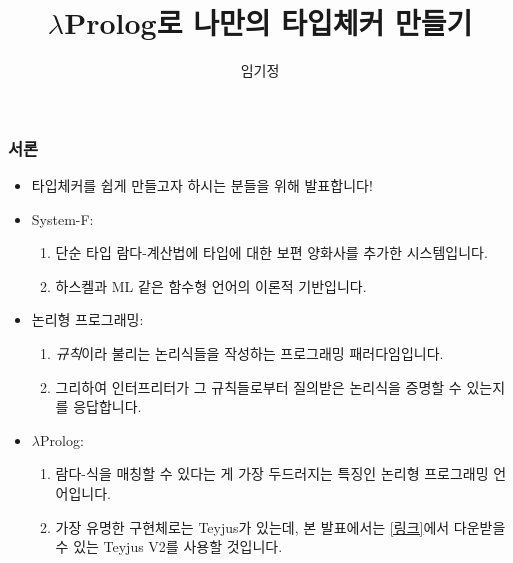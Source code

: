 \documentclass[slidestop,compress,mathserif]{beamer}
\author{ 임기정 }
\title{$\lambda$Prolog로 나만의 타입체커 만들기}
\begin{document}
    \begin{frame}
        \titlepage
    \end{frame}

    \begin{frame}
        \frametitle{서론}
        \begin{itemize}
            \item 타입체커를 쉽게 만들고자 하시는 분들을 위해 발표합니다!
            \pause
            \item System-F:
            \begin{enumerate}
                \item 단순 타입 람다-계산법에 타입에 대한 보편 양화사를 추가한 시스템입니다.
                \item 하스켈과 ML 같은 함수형 언어의 이론적 기반입니다.
            \end{enumerate}
            \pause
            \item 논리형 프로그래밍:
            \begin{enumerate}
                \item \textit{규칙}이라 불리는 논리식들을 작성하는 프로그래밍 패러다임입니다.
                \item 그리하여 인터프리터가 그 규칙들로부터 질의받은 논리식을 증명할 수 있는지를 응답합니다.
            \end{enumerate}
            \pause
            \item $\lambda$Prolog:
            \begin{enumerate}
                \item 람다-식을 매칭할 수 있다는 게 가장 두드러지는 특징인 논리형 프로그래밍 언어입니다.
                \item 가장 유명한 구현체로는 Teyjus가 있는데, 본 발표에서는 \href{https://github.com/teyjus/teyjus/releases}{[링크]}에서 다운받을 수 있는 Teyjus V2를 사용할 것입니다.
            \end{enumerate}
        \end{itemize}
    \end{frame}
    
\end{document}
